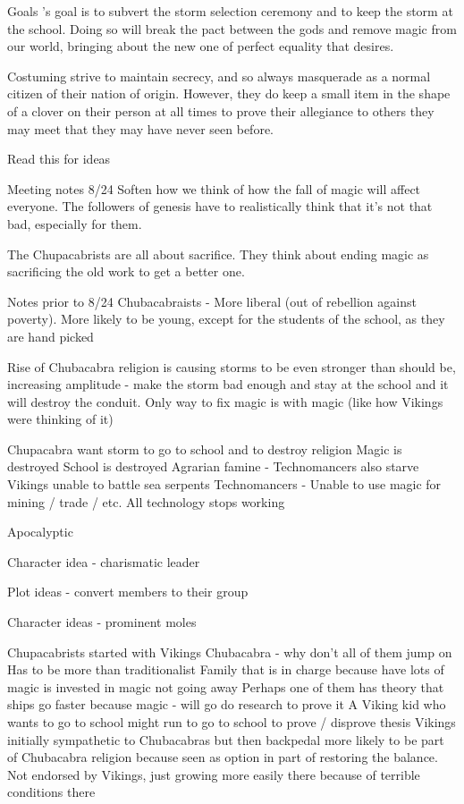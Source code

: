 \documentclass[blue]{GL2020}
\begin{document}
Goals
\pCult's goal is to subvert the storm selection ceremony and to keep the storm at the school. Doing so will break the pact between the gods and remove magic from our world, bringing about the new one of perfect equality that \pCult desires.

Costuming
\pCult strive to maintain secrecy, and so always masquerade as a normal citizen of their nation of origin. However, they do keep a small item in the shape of a clover on their person at all times to prove their allegiance to others they may meet that they may have never seen before.






Read this for ideas \/

Meeting notes 8/24
Soften how we think of how the fall of magic will affect everyone. The followers of genesis have to realistically think that it’s not that bad, especially for them.

The Chupacabrists are all about sacrifice. They think about ending magic as sacrificing the old work to get a better one.

Notes prior to 8/24
Chubacabraists - More liberal (out of rebellion against poverty). More likely to be young, except for the students of the school, as they are hand picked

Rise of Chubacabra religion is causing storms to be even stronger than should be, increasing amplitude - make the storm bad enough and stay at the school and it will destroy the conduit.  Only way to fix magic is with magic (like how Vikings were thinking of it)

Chupacabra want storm to go to school and to destroy religion
Magic is destroyed
School is destroyed
Agrarian famine - Technomancers also starve
Vikings unable to battle sea serpents
Technomancers - Unable to use magic for mining / trade / etc.  All technology stops working

Apocalyptic

Character idea - charismatic leader

Plot ideas - convert members to their group

Character ideas - prominent moles

Chupacabrists started with Vikings
Chubacabra - why don’t all of them jump on
Has to be more than traditionalist
Family that is in charge because have lots of magic is invested in magic not going away
Perhaps one of them has theory that ships go faster because magic - will go do research to prove it
A Viking kid who wants to go to school might run to go to school to prove / disprove thesis
Vikings initially sympathetic to Chubacabras but then backpedal
more likely to be part of Chubacabra religion because seen as option in part of restoring the balance.  Not endorsed by Vikings, just growing more easily there because of terrible conditions there
\end{document}
